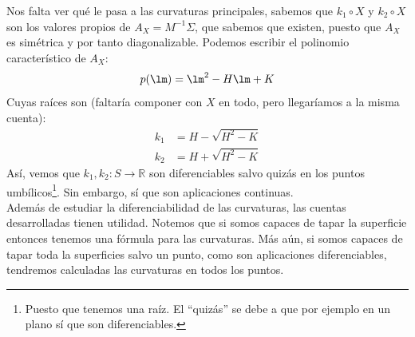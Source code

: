 \noindent
Nos falta ver qué le pasa a las curvaturas principales, sabemos que $k_1\circ X$  y $k_2\circ X$ son los valores propios de $A_X = M^{-1}\Sigma$, que sabemos que existen, puesto que $A_X$ es simétrica y por tanto diagonalizable. Podemos escribir el polinomio característico de $A_X$:
\begin{equation*}
    p(\lm) = \lm^2 -H\lm + K
\end{equation*}
Cuyas raíces son (faltaría componer con $X$ en todo, pero llegaríamos a la misma cuenta):
\begin{align*}
    k_1 &= H- \sqrt{H^2-K} \\
    k_2 &= H+ \sqrt{H^2-K}
\end{align*}
Así, vemos que $k_1,k_2:S\to\mathbb{R}$ son diferenciables salvo quizás en los puntos umbílicos\footnote{Puesto que tenemos una raíz. El ``quizás'' se debe a que por ejemplo en un plano sí que son diferenciables.}. Sin embargo, sí que son aplicaciones continuas.\\

\noindent
Además de estudiar la diferenciabilidad de las curvaturas, las cuentas desarrolladas tienen utilidad. Notemos que si somos capaces de tapar la superficie entonces tenemos una fórmula para las curvaturas. Más aún, si somos capaces de tapar toda la superficies salvo un punto, como son aplicaciones diferenciables, tendremos calculadas las curvaturas en todos los puntos.

